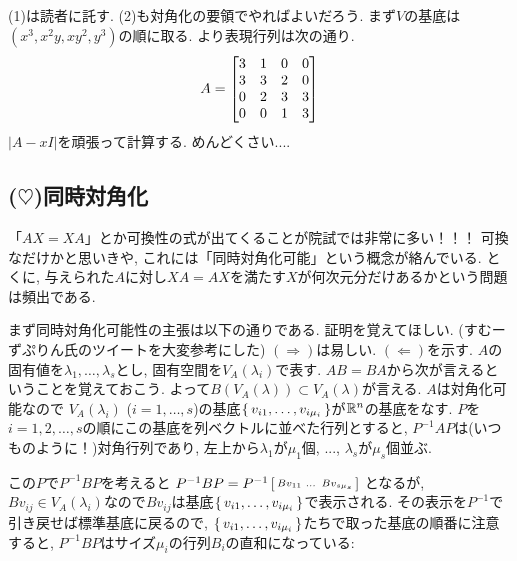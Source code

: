 \begin{egans}
(1)は読者に託す. (2)も対角化の要領でやればよいだろう. まず$V$の基底は$(x^3,x^2y,xy^2,y^3)$の順に取る.
より表現行列は次の通り.
\[
A = \begin{bmatrix}
3 & 1 & 0 & 0 \\
3 & 3 & 2 & 0 \\
0 & 2 & 3 & 3 \\
0 & 0 & 1 & 3
\end{bmatrix}
\]
$|A-xI|$を頑張って計算する. めんどくさい....
\end{egans}


\newpage
\subsection{($\heartsuit$)同時対角化}
「$AX = XA$」とか可換性の式が出てくることが院試では非常に多い！！！ 可換なだけかと思いきや, これには「同時対角化可能」という概念が絡んでいる. とくに, 与えられた$A$に対し$XA=AX$を満たす$X$が何次元分だけあるかという問題は頻出である. \par
まず同時対角化可能性の主張は以下の通りである. 証明を覚えてほしい.
\prf (すむーずぷりん氏のツイートを大変参考にした)
$(\Rightarrow)$は易しい. $(\Leftarrow)$を示す. $A$の固有値を$\lambda_1,\dots,\lambda_s$とし, 固有空間を$V_A(\lambda_i)$で表す.  $AB=BA$から次が言えるということを覚えておこう.
よって$B(V_A(\lambda)) \subset V_{A}(\lambda)$が言える. $A$は対角化可能なので $V_A(\lambda_i)$ ($i=1,\dots, s$)の基底$\set{v_{i1},\dots, v_{i\mu_i}}$が$\mathbb{R}^n$の基底をなす. $P$を$i=1,2,\dots, s$の順にこの基底を列ベクトルに並べた行列とすると, $P^{-1}AP$は(いつものように！)対角行列であり, 左上から$\lambda_1$が$\mu_1$個, ..., $\lambda_s$が$\mu_s$個並ぶ. \par
この$P$で$P^{-1}BP$を考えると $P^{-1}BP = P^{-1}\left[\begin{smallmatrix} Bv_{11} &\dots& Bv_{s\mu_s}\end{smallmatrix}\right]$ となるが, $B v_{ij} \in V_{A}(\lambda_i)$なので$Bv_{ij}$は基底$\set{v_{i1},\dots, v_{i\mu_i}}$で表示される. その表示を$P^{-1}$で引き戻せば標準基底に戻るので, $\set{v_{i1},\dots, v_{i\mu_i}}$たちで取った基底の順番に注意すると,  $P^{-1}BP$はサイズ$\mu_i$の行列$B_i$の直和になっている:
